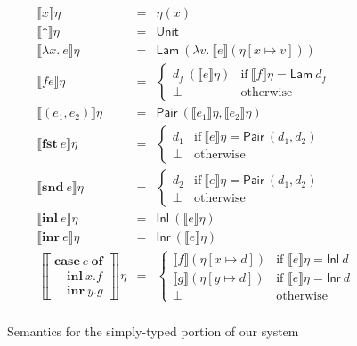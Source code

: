 \documentclass[natbib]{sigplanconf}
\newcommand{\kw}[1]{\textbf{#1}}
\newcommand{\ident}[1]{\textit{#1}}
\newcommand{\sem}[1]{\llbracket #1 \rrbracket}
\newcommand{\semCons}[1]{\mathsf{#1}}
\begin{document}
\begin{figure}[t]
  \centering
\begin{eqnarray*}
  \sem{x}\eta & = & \eta(x) \\
  \sem{*}\eta & = & \semCons{Unit} \\
  \sem{\lambda x.\ e}\eta & = & \semCons{Lam}\ (\lambda v.\ \sem{e}(\eta[x \mapsto v])) \\
  \sem{fe}\eta & = & \left\{
    \begin{array}{ll}
      d_f\ (\sem{e}\eta) & \textrm{if}\ \sem{f}\eta = \semCons{Lam}\ d_f \\
      \bot & \textrm{otherwise}
    \end{array}
    \right. \\
  \sem{(e_1,e_2)}\eta & = & \semCons{Pair}\ (\sem{e_1}\eta, \sem{e_2}\eta) \\
  \sem{\kw{fst}\ e}\eta & = & \left\{
    \begin{array}{ll}
      d_1 & \textrm{if}\ \sem{e}\eta = \semCons{Pair}\ (d_1, d_2) \\
      \bot & \textrm{otherwise}
    \end{array}
  \right. \\
  \sem{\kw{snd}\ e}\eta & = & \left\{
    \begin{array}{ll}
      d_2 & \textrm{if}\ \sem{e}\eta = \semCons{Pair}\ (d_1, d_2) \\
      \bot & \textrm{otherwise}
    \end{array}
  \right. \\
  \sem{\kw{inl}\ e}\eta & = & \semCons{Inl}\ (\sem{e}\eta) \\
  \sem{\kw{inr}\ e}\eta & = & \semCons{Inr}\ (\sem{e}\eta) \\
  \left\llbracket
    \begin{array}{l}
      \kw{case}\ e\ \kw{of}\\
      \quad\kw{inl}\ \ident{x}.f\\
      \quad\kw{inr}\ \ident{y}.g
    \end{array}
  \right\rrbracket\eta & = &
  \left\{
    \begin{array}{ll}
      \sem{f}(\eta[x \mapsto d]) & \textrm{if }\sem{e}\eta = \semCons{Inl}\ d \\
      \sem{g}(\eta[y \mapsto d]) & \textrm{if }\sem{e}\eta = \semCons{Inr}\ d \\
      \bot & \textrm{otherwise}
    \end{array}
  \right. \\
\end{eqnarray*}  
  \caption{Semantics for the simply-typed portion of our system}
  \label{fig:semantics1}
\end{figure}
\end{document}
